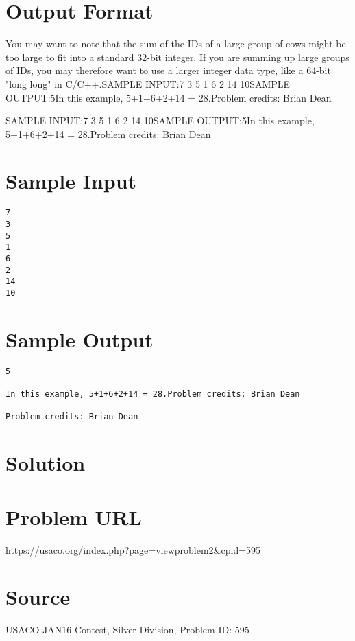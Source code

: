 \documentclass[12pt]{article}
\begin{document}
\section*{Output Format}
You may want to note that the sum of the IDs of a large group of cows might be
too large to fit into a standard 32-bit integer.  If you are summing up large
groups of IDs, you may therefore want to use a larger integer data type, like a
64-bit "long long" in C/C++.SAMPLE INPUT:7
3
5
1
6
2
14
10SAMPLE OUTPUT:5In this example, 5+1+6+2+14 = 28.Problem credits: Brian Dean

SAMPLE INPUT:7
3
5
1
6
2
14
10SAMPLE OUTPUT:5In this example, 5+1+6+2+14 = 28.Problem credits: Brian Dean

\section*{Sample Input}
\begin{verbatim}
7
3
5
1
6
2
14
10
\end{verbatim}

\section*{Sample Output}
\begin{verbatim}
5

In this example, 5+1+6+2+14 = 28.Problem credits: Brian Dean

Problem credits: Brian Dean
\end{verbatim}

\section*{Solution}


\section*{Problem URL}
https://usaco.org/index.php?page=viewproblem2&cpid=595

\section*{Source}
USACO JAN16 Contest, Silver Division, Problem ID: 595
\end{document}
